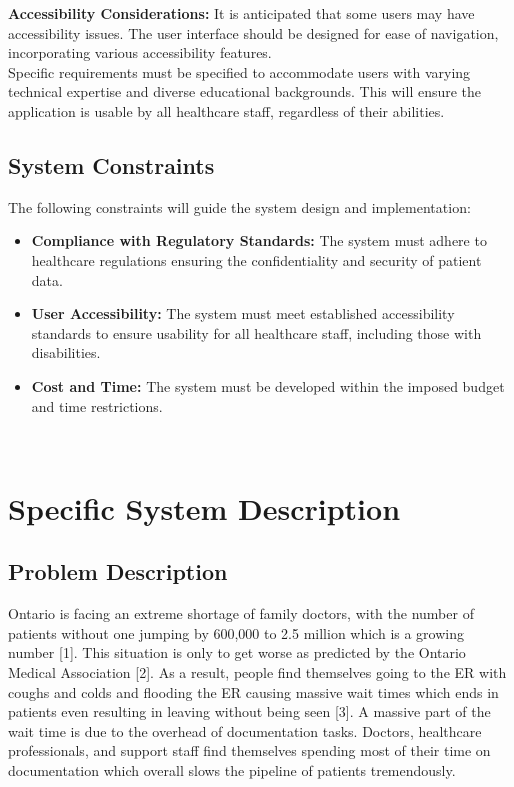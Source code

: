 \documentclass[12pt]{article}
\begin{document}
\textbf{Accessibility Considerations:} It is anticipated that some users may have accessibility issues. The user interface should be designed for ease of navigation, incorporating various accessibility features.\\

Specific requirements must be specified to accommodate users with varying technical expertise and diverse educational backgrounds. This will ensure the application is usable by all healthcare staff, regardless of their abilities.


\subsection{System Constraints}

The following constraints will guide the system design and implementation:

\begin{itemize} 

  \item \textbf{Compliance with Regulatory Standards:} The system must adhere to healthcare regulations ensuring the confidentiality and security of patient data.

  \item \textbf{User Accessibility:} The system must meet established accessibility standards to ensure usability for all healthcare staff, including those with disabilities.

  \item \textbf{Cost and Time:} The system must be developed within the imposed budget and time restrictions.

\end{itemize}


~\newpage

\section{Specific System Description} \label{sec_SpecificSystemDescription}


\subsection{Problem Description} \label{sec_ProblemDescription}

Ontario is facing an extreme shortage of family doctors, with the number of patients without one jumping by 600,000 to 2.5 million which is a growing number [1]. This situation is only to get worse as predicted by the Ontario Medical Association [2]. As a result, people find themselves going to the ER with coughs and colds and flooding the ER causing massive wait times which ends in patients even resulting in leaving without being seen [3]. A massive part of the wait time is due to the overhead of documentation tasks. Doctors, healthcare professionals, and support staff find themselves spending most of their time on documentation which overall slows the pipeline of patients tremendously.
\end{document}
